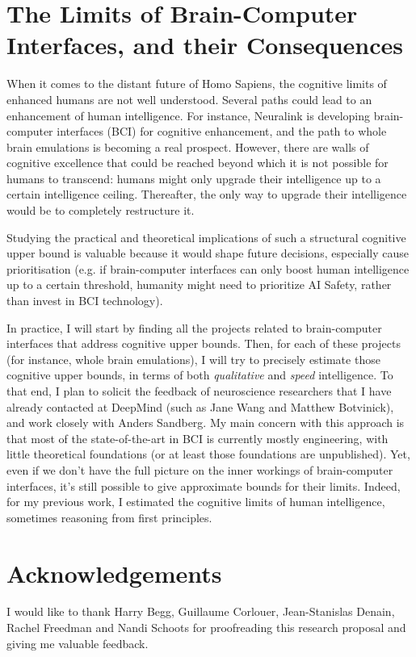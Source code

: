 \documentclass{article}
\begin{document}
\section*{The Limits of Brain-Computer Interfaces, and their Consequences}

When it comes to the distant future of Homo Sapiens, the cognitive limits of enhanced humans are not well understood. Several paths could lead to an enhancement of human intelligence. For instance, Neuralink is developing brain-computer interfaces (BCI) for cognitive enhancement, and the path to whole brain emulations is becoming a real prospect\cite{waitbutwhy2017}\cite{sandberg2013feasibility}\cite{sandberg2008whole}. However, there are walls of cognitive excellence that could be reached beyond which it is not possible for humans to transcend: humans might only upgrade their intelligence up to a certain intelligence ceiling. Thereafter, the only way to upgrade their intelligence would be to completely restructure it.

Studying the practical and theoretical implications of such a structural cognitive upper bound is valuable because it would shape future decisions, especially cause prioritisation (e.g. if brain-computer interfaces can only boost human intelligence up to a certain threshold, humanity might need to prioritize AI Safety, rather than invest in BCI technology).

In practice, I will start by finding all the projects related to brain-computer interfaces that address cognitive upper bounds. Then, for each of these projects (for instance, whole brain emulations), I will try to precisely estimate those cognitive upper bounds, in terms of both \textit{qualitative} and \textit{speed} intelligence\cite{Bostrom2014}. To that end, I plan to solicit the feedback of neuroscience researchers that I have already contacted at DeepMind (such as Jane Wang and Matthew Botvinick), and work closely with Anders Sandberg. My main concern with this approach is that most of the state-of-the-art in BCI is currently mostly engineering, with little theoretical foundations (or at least those foundations are unpublished). Yet, even if we don't have the full picture on the inner workings of brain-computer interfaces, it's still possible to give approximate bounds for their limits. Indeed, for my previous work\cite{Trazzi2018stupidity}, I estimated the cognitive limits of human intelligence, sometimes reasoning from first principles.

\section*{Acknowledgements}

I would like to thank Harry Begg, Guillaume Corlouer, Jean-Stanislas Denain,  Rachel Freedman and Nandi Schoots for proofreading this research proposal and giving me valuable feedback.

\printbibliography
\end{document}
